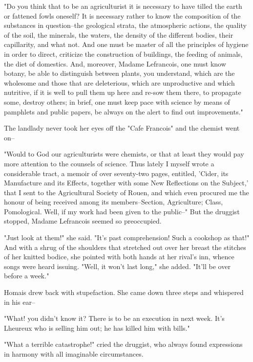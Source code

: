 \documentclass[11pt,twocolumn]{ltugboat}
\begin{document}
"Do you think that to be an agriculturist it is necessary to have tilled
the earth or fattened fowls oneself? It is necessary rather to know the
composition of the substances in question--the geological strata, the
atmospheric actions, the quality of the soil, the minerals, the waters,
the density of the different bodies, their capillarity, and what not.
And one must be master of all the principles of hygiene in order to
direct, criticize the construction of buildings, the feeding of animals,
the diet of domestics. And, moreover, Madame Lefrancois, one must know
botany, be able to distinguish between plants, you understand, which are
the wholesome and those that are deleterious, which are unproductive
and which nutritive, if it is well to pull them up here and re-sow them
there, to propagate some, destroy others; in brief, one must keep pace
with science by means of pamphlets and public papers, be always on the
alert to find out improvements."

The landlady never took her eyes off the "Cafe Francois" and the chemist
went on--

"Would to God our agriculturists were chemists, or that at least they
would pay more attention to the counsels of science. Thus lately I
myself wrote a considerable tract, a memoir of over seventy-two pages,
entitled, 'Cider, its Manufacture and its Effects, together with some
New Reflections on the Subject,' that I sent to the Agricultural Society
of Rouen, and which even procured me the honour of being received among
its members--Section, Agriculture; Class, Pomological. Well, if my
work had been given to the public--" But the druggist stopped, Madame
Lefrancois seemed so preoccupied.

"Just look at them!" she said. "It's past comprehension! Such a cookshop
as that!" And with a shrug of the shoulders that stretched out over her
breast the stitches of her knitted bodice, she pointed with both hands
at her rival's inn, whence songs were heard issuing. "Well, it won't
last long," she added. "It'll be over before a week."

Homais drew back with stupefaction. She came down three steps and
whispered in his ear--

"What! you didn't know it? There is to be an execution in next week.
It's Lheureux who is selling him out; he has killed him with bills."

"What a terrible catastrophe!" cried the druggist, who always found
expressions in harmony with all imaginable circumstances.
\end{document}
